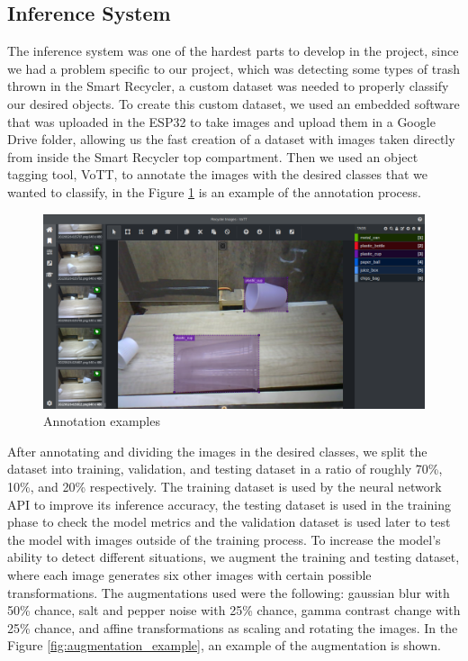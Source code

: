 \documentclass[a4paper,11pt]{article}
\begin{document}
\subsection{Inference System}
The inference system was one of the hardest parts to develop in the project, since we had a problem specific to our project, which was detecting some types of trash thrown in the Smart Recycler, a custom dataset was needed to properly classify our desired objects. To create this custom dataset, we used an embedded software that was uploaded in the ESP32 to take images and upload them in a Google Drive folder, allowing us the fast creation of a dataset with images taken directly from inside the Smart Recycler top compartment. Then we used an object tagging tool, VoTT, to annotate the images with the desired classes that we wanted to classify, in the Figure \ref{fig:annotation_example} is an example of the annotation process.

\begin{figure}[H]
  \centering
  \includegraphics[width=12.5cm]{Figures/annotation_example.png}
  \caption{\small{Annotation examples}}
  \label{fig:annotation_example}
\end{figure}

After annotating and dividing the images in the desired classes, we split the dataset into training, validation, and testing dataset in a ratio of roughly 70\%, 10\%, and 20\% respectively. The training dataset is used by the neural network API to improve its inference accuracy, the testing dataset is used in the training phase to check the model metrics and the validation dataset is used later to test the model with images outside of the training process. To increase the model’s ability to detect different situations, we augment the training and testing dataset, where each image generates six other images with certain possible transformations. The augmentations used were the following: gaussian blur with 50\% chance, salt and pepper noise with 25\% chance, gamma contrast chan\-ge with 25\% chance, and affine transformations as scaling and rotating the images. In the Figure \ref{fig:augmentation_example}, an example of the augmentation is shown.
\end{document}
